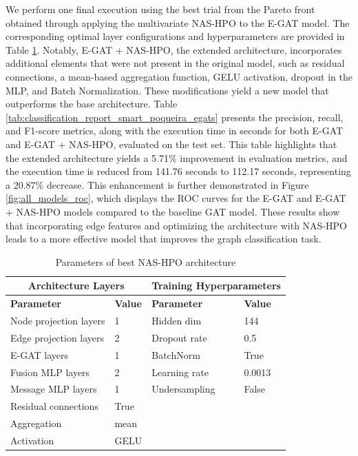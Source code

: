 \documentclass[journal]{IEEEtran}
\begin{document}
We perform one final execution using the best trial from the Pareto front obtained through applying the multivariate NAS-HPO to the E-GAT model. The corresponding optimal layer configurations and hyperparameters are provided in Table \ref{tab:best_trial_parameters}. Notably, E-GAT + NAS-HPO, the extended architecture, incorporates additional elements that were not present in the original model, such as residual connections, a mean-based aggregation function, GELU activation, dropout in the MLP, and Batch Normalization. These modifications yield a new model that outperforms the base architecture. Table \ref{tab:classification_report_smart_poqueira_egats} presents the precision, recall, and F1-score metrics, along with the execution time in seconds for both E-GAT and E-GAT + NAS-HPO, evaluated on the test set. This table highlights that the extended architecture yields a 5.71\% improvement in evaluation metrics, and the execution time is reduced from 141.76 seconds to 112.17 seconds, representing a 20.87\% decrease. This enhancement is further demonstrated in Figure \ref{fig:all_models_roc}, which displays the ROC curves for the E-GAT and E-GAT + NAS-HPO models compared to the baseline GAT model. These results show that incorporating edge features and optimizing the architecture with NAS-HPO leads to a more effective model that improves the graph classification task.




\begin{table}[htbp]
    \centering
    \caption{Parameters of best NAS-HPO architecture}
    \label{tab:best_trial_parameters}
    \begin{tabular}{llll}
    \toprule
 \multicolumn{2}{c}{\textbf{Architecture Layers}}& \multicolumn{2}{c}{\textbf{Training Hyperparameters}}\\
        \midrule
        \textbf{Parameter} & \textbf{Value}  & \textbf{Parameter}&\textbf{Value}\\
        \midrule
        Node projection layers   & 1  & Hidden dim               &144  \\
        Edge projection layers   & 2  & Dropout rate             &0.5  \\
        E-GAT layers              & 1  & BatchNorm                &True  \\
        Fusion MLP layers        & 2  & Learning rate            &0.0013  \\
        Message MLP layers       & 1  & Undersampling            &False  \\
        Residual connections     & True  & &\\
        Aggregation              & mean  & &\\
        Activation               & GELU  & &\\
        \bottomrule
    \end{tabular}
\end{table}
\end{document}
